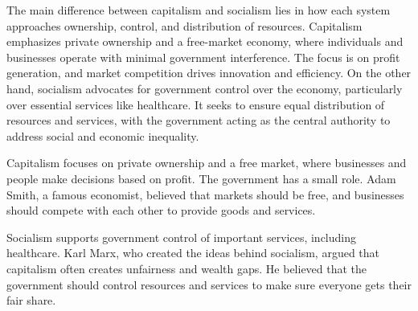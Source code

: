 \par 
The main difference between capitalism and socialism 
lies in how each system approaches ownership, control, and distribution of resources. 
Capitalism emphasizes private ownership and a free-market economy, 
where individuals and businesses operate with minimal government interference. 
The focus is on profit generation, and market competition drives innovation and efficiency.
On the other hand, socialism advocates for government control over the economy, 
particularly over essential services like healthcare. 
It seeks to ensure equal distribution of resources and services, 
with the government acting as the central authority to address social and economic inequality.

\par
Capitalism focuses on private ownership and a free market, 
where businesses and people make decisions based on profit. 
The government has a small role. Adam Smith, a famous economist, 
believed that markets should be free, and businesses should compete 
with each other to provide goods and services.

\par
Socialism supports government control of important services, 
including healthcare. Karl Marx, who created the ideas behind socialism, 
argued that capitalism often creates unfairness and wealth gaps. 
He believed that the government should control resources and 
services to make sure everyone gets their fair share.